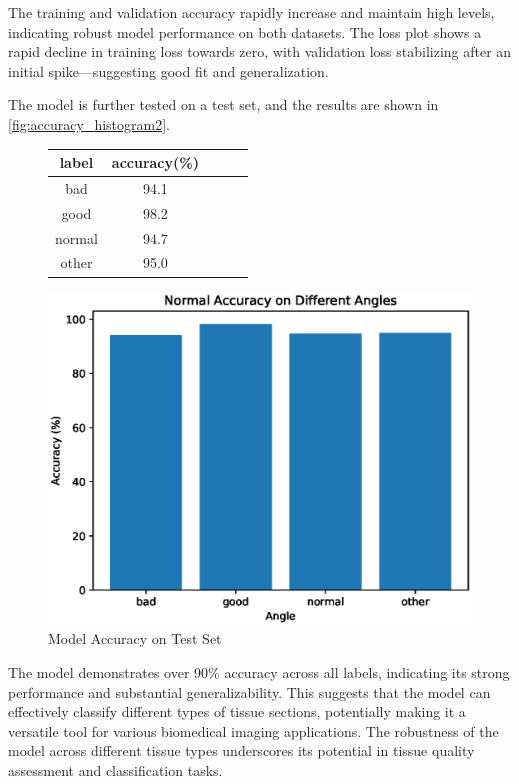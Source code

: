 The training and validation accuracy rapidly increase and maintain high levels, indicating robust model performance on both datasets. The loss plot shows a rapid decline in training loss towards zero, with validation loss stabilizing after an initial spike—suggesting good fit and generalization.

The model is further tested on a test set, and the results are shown in \autoref{fig:accuracy_histogram2}.

\begin{figure}[H]
    \begin{minipage}{0.45\textwidth}
        \centering
        \begin{tabular}{ccccc}
            \toprule
            label & accuracy(\%) \\
            \midrule
            bad & 94.1 \\
            good & 98.2 \\
            normal & 94.7 \\
            other & 95.0 \\
            \bottomrule
        \end{tabular}
        \label{tab:model_accuracy3}
    \end{minipage}
    \begin{minipage}{0.45\textwidth}
        \centering
        \includegraphics[width=\textwidth]{./fig/assistplot/angle_accuracy2.eps}
        \caption{Model Accuracy on Test Set}
        \label{fig:accuracy_histogram2}
    \end{minipage}
\end{figure}

The model demonstrates over 90\% accuracy across all labels, indicating its strong performance and substantial generalizability. This suggests that the model can effectively classify different types of tissue sections, potentially making it a versatile tool for various biomedical imaging applications.
The robustness of the model across different tissue types underscores its potential in tissue quality assessment and classification tasks.




\FloatBarrier